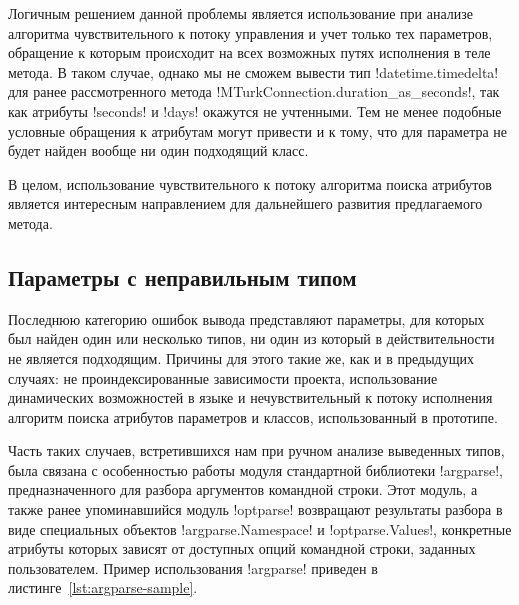 Логичным решением данной проблемы является использование при анализе алгоритма
чувствительного к потоку управления и учет только тех параметров, обращение к
которым происходит на всех возможных путях исполнения в теле метода. В таком
случае, однако мы не сможем вывести тип !datetime.timedelta! для ранее
рассмотренного метода !MTurkConnection.duration_as_seconds!, так как атрибуты
!seconds! и !days! окажутся не учтенными. Тем не менее подобные условные обращения
к атрибутам могут привести и к тому, что для параметра не будет найден вообще ни
один подходящий класс. 

В целом, использование чувствительного к потоку алгоритма поиска
атрибутов является интересным направлением для дальнейшего развития
предлагаемого метода.

\subsection{Параметры с неправильным типом}
\label{sub:unsound-incomplete}

Последнюю категорию ошибок вывода представляют параметры, для которых был найден
один или несколько типов, ни один из который в действительности не является
подходящим. Причины для этого такие же, как и в предыдущих случаях:
не проиндексированные зависимости проекта, использование динамических
возможностей в языке и нечувствительный к потоку исполнения алгоритм поиска
атрибутов параметров и классов, использованный в прототипе. 


Часть таких случаев, встретившихся нам при ручном анализе выведенных типов, была
связана с особенностью работы модуля стандартной библиотеки !argparse!,
предназначенного для разбора аргументов командной строки.
Этот модуль, а также ранее упоминавшийся модуль !optparse! возвращают результаты
разбора в виде специальных объектов !argparse.Namespace! и !optparse.Values!,
конкретные атрибуты которых зависят от доступных опций командной строки,
заданных пользователем. Пример использования !argparse! приведен в
листинге~\ref{lst:argparse-sample}.

